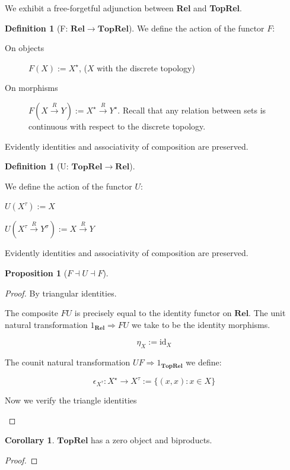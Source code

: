 \documentclass{tufte-handout}
\theoremstyle{definition}
\newtheorem{corollary}[theorem]{Corollary}
\newtheorem{proposition}[theorem]{Proposition}
\newtheorem{defn}[theorem]{Definition}
\begin{document}
We exhibit a free-forgetful adjunction between \textbf{Rel} and \textbf{TopRel}.

\begin{defn}[F: $\mathbf{Rel} \rightarrow \mathbf{TopRel}$] We define the action of the functor $F$:
\begin{description}
\item[On objects] $F(X) := X^\star$, ($X$ with the discrete topology)
\item[On morphisms] $F(X \overset{R}{\rightarrow} Y) := X^\star \overset{R}{\rightarrow} Y^\star$. Recall that any relation between sets is continuous with respect to the discrete topology.
\end{description}
Evidently identities and associativity of composition are preserved.
\end{defn}

\begin{defn}[U: $\mathbf{TopRel} \rightarrow \mathbf{Rel}$]
\begin{description} We define the action of the functor $U$:
\item[On objects] $U(X^\tau) := X$
\item[On morphisms] $U(X^\tau \overset{R}{\rightarrow} Y^\sigma) := X \overset{R}{\rightarrow} Y$
\end{description}
Evidently identities and associativity of composition are preserved.
\end{defn}

\begin{proposition}[$F \dashv U \dashv F$]
\begin{proof}

By triangular identities.

The composite $FU$ is precisely equal to the identity functor on $\mathbf{Rel}$. The unit natural transformation $1_\mathbf{Rel} \Rightarrow FU$ we take to be the identity morphisms.

\[\eta_{X} := \text{id}_{X}\]

The counit natural transformation $UF \Rightarrow 1_{\mathbf{TopRel}}$ we define:

\[\epsilon_{X^\tau} : X^\star \rightarrow X^\tau := \{(x,x) : x \in X\}\]

Now we verify the triangle identities

\[\]

\end{proof}
\end{proposition}

\begin{corollary}
$\mathbf{TopRel}$ has a zero object and biproducts.
\begin{proof}

\end{proof}
\end{corollary}
\end{document}
